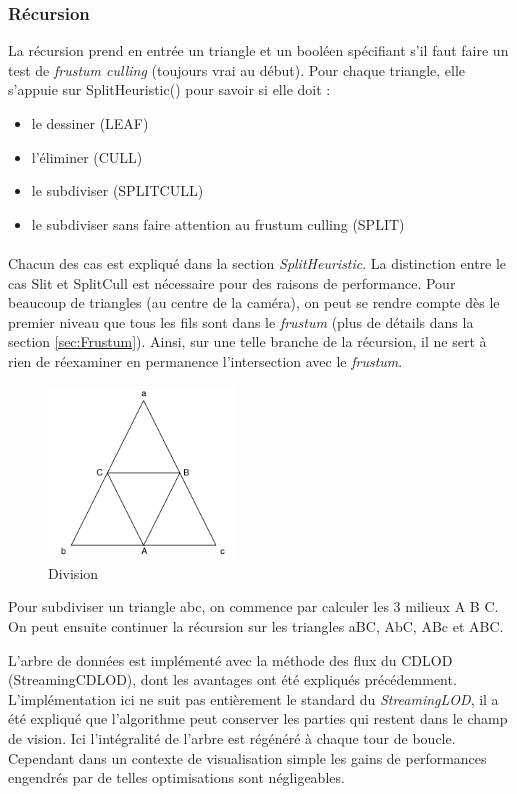 	\newpage
	\subsubsection{Récursion}
	
	La récursion prend en entrée un triangle et un booléen spécifiant s'il faut faire un test de \textit{frustum culling} (toujours vrai au début). Pour chaque triangle, elle s'appuie sur SplitHeuristic() pour savoir si elle doit :
	\begin{itemize} 
	\item le dessiner (LEAF)
	\item l'éliminer (CULL)
	\item le subdiviser (SPLITCULL)
	\item le subdiviser sans faire attention au frustum culling (SPLIT)
	\end{itemize}
	\paragraph{}
	Chacun des cas est expliqué dans la section \textit{SplitHeuristic}.
	La distinction entre le cas Slit et SplitCull est nécessaire pour des raisons de performance. Pour beaucoup de triangles (au centre de la caméra), on peut se rendre compte dès le premier niveau que tous les fils sont dans le \textit{frustum} (plus de détails dans la section \ref{sec:Frustum}). Ainsi, sur une telle branche de la récursion, il ne sert à rien de réexaminer en permanence l'intersection avec le \textit{frustum}.
	
	\begin{figure}[H]
        \centerline{\includegraphics[width=5cm]{img/TriangleSplit.png}}
        \caption{Division}
        \label{fig:TriangleSplit}
    \end{figure}
    Pour subdiviser un triangle abc, on commence par calculer les 3 milieux A B C.
	 On peut ensuite continuer la récursion sur les triangles aBC, AbC, ABc et ABC.
	
\iffalse
L'arbre de données est implémenté avec la méthode des flux du CDLOD (StreamingCDLOD), dont les avantages ont été expliqués précédemment.
	L'implémentation ici ne suit pas entièrement le standard du \textit{StreamingLOD}, il a été expliqué que l'algorithme peut conserver les parties qui restent dans le champ de vision. Ici l'intégralité de l'arbre est régénéré à chaque tour de boucle. Cependant dans un contexte de visualisation simple les gains de performances engendrés par de telles optimisations sont négligeables.
	
